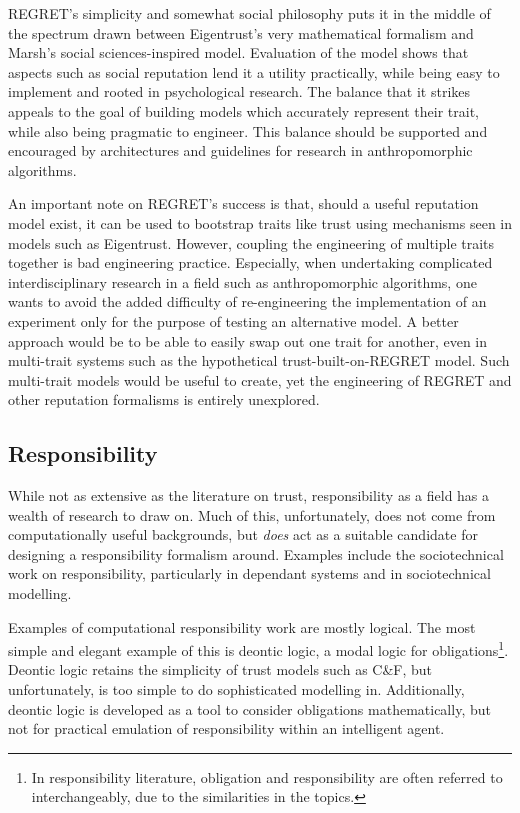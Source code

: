 \documentclass[11pt,english,twocolumn]{article}
\begin{document}
REGRET's simplicity and somewhat social philosophy puts it in the middle of the spectrum drawn between Eigentrust's very mathematical formalism and Marsh's social sciences-inspired model. Evaluation of the model shows that aspects such as social reputation lend it a utility practically, while being easy to implement and rooted in psychological research. The balance that it strikes appeals to the goal of building models which accurately represent their trait, while also being pragmatic to engineer. This balance should be supported and encouraged by architectures and guidelines for research in anthropomorphic algorithms.\par

An important note on REGRET's success is that, should a useful reputation model exist, it can be used to bootstrap traits like trust using mechanisms seen in models such as Eigentrust\cite{Kamvar2003}. However, coupling the engineering of multiple traits together is bad engineering practice. Especially, when undertaking complicated interdisciplinary research in a field such as anthropomorphic algorithms, one wants to avoid the added difficulty of re-engineering the implementation of an experiment only for the purpose of testing an alternative model. A better approach would be to be able to easily swap out one trait for another, even in multi-trait systems such as the hypothetical trust-built-on-REGRET model. Such multi-trait models would be useful to create, yet the engineering of REGRET and other reputation formalisms is entirely unexplored.\par


\subsection{Responsibility}
While not as extensive as the literature on trust, responsibility as a field has a wealth of research to draw on. Much of this, unfortunately, does not come from computationally useful backgrounds, but \emph{does} act as a suitable candidate for designing a responsibility formalism around. Examples include the sociotechnical work on responsibility, particularly in dependant systems\cite{Sommerville:2007ec} and in sociotechnical modelling\cite{Simpson2015}.\par

Examples of computational responsibility work are mostly logical. The most simple and elegant example of this is deontic logic\cite{deontic-logic}, a modal logic for obligations\footnote{In responsibility literature, obligation and responsibility are often referred to interchangeably, due to the similarities in the topics.}. Deontic logic retains the simplicity of trust models such as C\&F, but unfortunately, is too simple to do sophisticated modelling in. Additionally, deontic logic is developed as a tool to consider obligations mathematically, but not for practical emulation of responsibility within an intelligent agent.\par
\end{document}
